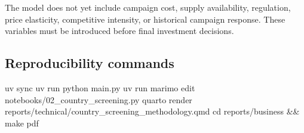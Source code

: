 \begin{limitation}
The model does not yet include campaign cost, supply availability, regulation, price elasticity, competitive intensity, or historical campaign response. These variables must be introduced before final investment decisions.
\end{limitation}

\subsection{Reproducibility commands}

\begin{terminal}
uv sync
uv run python main.py
uv run marimo edit notebooks/02_country_screening.py
quarto render reports/technical/country_screening_methodology.qmd
cd reports/business && make pdf
\end{terminal}
